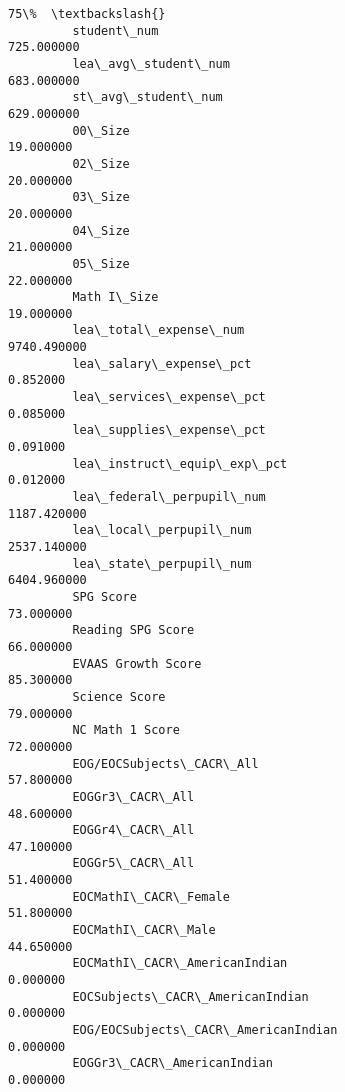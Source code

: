 \documentclass[11pt]{article}
\begin{document}
\begin{Verbatim}[commandchars=\\\{\}]
                                                                       75\%  \textbackslash{}
         student\_num                                            725.000000   
         lea\_avg\_student\_num                                    683.000000   
         st\_avg\_student\_num                                     629.000000   
         00\_Size                                                 19.000000   
         02\_Size                                                 20.000000   
         03\_Size                                                 20.000000   
         04\_Size                                                 21.000000   
         05\_Size                                                 22.000000   
         Math I\_Size                                             19.000000   
         lea\_total\_expense\_num                                 9740.490000   
         lea\_salary\_expense\_pct                                   0.852000   
         lea\_services\_expense\_pct                                 0.085000   
         lea\_supplies\_expense\_pct                                 0.091000   
         lea\_instruct\_equip\_exp\_pct                               0.012000   
         lea\_federal\_perpupil\_num                              1187.420000   
         lea\_local\_perpupil\_num                                2537.140000   
         lea\_state\_perpupil\_num                                6404.960000   
         SPG Score                                               73.000000   
         Reading SPG Score                                       66.000000   
         EVAAS Growth Score                                      85.300000   
         Science Score                                           79.000000   
         NC Math 1 Score                                         72.000000   
         EOG/EOCSubjects\_CACR\_All                                57.800000   
         EOGGr3\_CACR\_All                                         48.600000   
         EOGGr4\_CACR\_All                                         47.100000   
         EOGGr5\_CACR\_All                                         51.400000   
         EOCMathI\_CACR\_Female                                    51.800000   
         EOCMathI\_CACR\_Male                                      44.650000   
         EOCMathI\_CACR\_AmericanIndian                             0.000000   
         EOCSubjects\_CACR\_AmericanIndian                          0.000000   
         EOG/EOCSubjects\_CACR\_AmericanIndian                      0.000000   
         EOGGr3\_CACR\_AmericanIndian                               0.000000   

\end{Verbatim}
\end{document}
